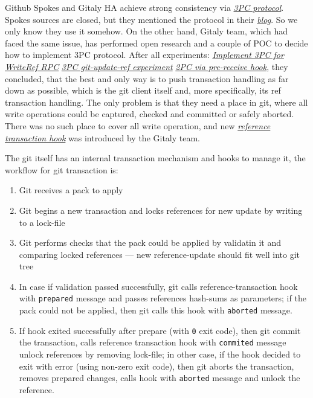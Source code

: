 \documentclass[acmlarge, screen, nonacm, 11pt]{acmart}
\newcommand{\code}[1]{\texttt{#1}}
\begin{document}
Github Spokes and Gitaly HA achieve strong consistency via \emph{\href{https://en.wikipedia.org/wiki/Three-phase_commit_protocol}{3PC protocol}}.
Spokes sources are closed, but they mentioned the protocol in their \emph{\href{https://github.blog/2017-10-13-stretching-spokes/\#reducing-round-trips}{blog}}.
So we only know they use it somehow.
On the other hand, Gitaly team, which had faced the same issue, has performed open research and a couple of POC to decide how to implement 3PC protocol.
After all experiments:
\emph{\href{https://gitlab.com/gitlab-org/gitaly/-/issues/2466}{Implement 3PC for WriteRef RPC}}
\emph{\href{https://gitlab.com/gitlab-org/gitaly/-/issues/2529}{3PC git-update-ref experiment}}
\emph{\href{https://gitlab.com/gitlab-org/gitaly/-/issues/2635}{2PC via pre-receive hook}},
  they concluded, that the best and only way is to push transaction handling as far down as possible, which is the git client itself and, more specifically, its ref transaction handling.
The only problem is that they need a place in git, where all write operations could be captured, checked and committed or safely aborted.
There was no such place to cover all write operation, and new
\emph{\href{https://github.com/git/git/commit/675415976704459edaf8fb39a176be2be0f403d8}{reference transaction hook}}
was introduced by the Gitaly team.

The git itself has an internal transaction mechanism and hooks to manage it, the workflow for git transaction is:
\begin{enumerate}
  \item Git receives a pack to apply
  \item Git begins a new transaction and locks references for new update by writing to a lock-file
  \item Git performs checks that the pack could be applied by validatin it and comparing locked references ---
    new reference-update should fit well into git tree
  \item In case if validation passed successfully, git calls reference-transaction hook with \code{prepared}
    message and passes references hash-sums as parameters; if the pack could not be applied, then git
    calls this hook with \code{aborted} message.
  \item If hook exited successfully after prepare (with \code{0} exit code), then git commit the transaction,
    calls reference transaction hook with \code{commited} message unlock references by removing lock-file; in other case,
    if the hook decided to exit with error (using non-zero exit code), then git aborts the transaction,
    removes prepared changes, calls hook with \code{aborted} message and unlock the reference.
\end{enumerate}
\end{document}
